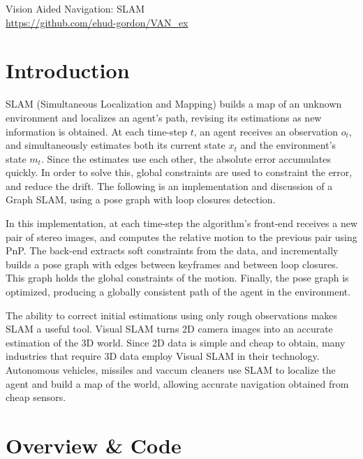 \documentclass[12pt]{article}
\begin{document}
\begin{center}
    {\huge Vision Aided Navigation: SLAM}
    \\[1\baselineskip]
    \url{https://github.com/ehud-gordon/VAN_ex}
\end{center}
\tableofcontents
\section{Introduction}
SLAM (Simultaneous Localization and Mapping) builds a map of an unknown environment and localizes an agent's path, revising its estimations as new information is obtained. At each time-step $t$, an agent receives an observation \(o_t\), and simultaneously estimates both its current state $x_t$ and the environment's state $m_t$. Since the estimates use each other, the absolute error accumulates quickly. In order to solve this, global constraints are used to constraint the error, and reduce the drift. The following is an implementation and discussion of a Graph SLAM, using a pose graph with loop closures detection. 

In this implementation, at each time-step the algorithm's front-end receives a new pair of stereo images, and computes the relative motion to the previous pair using PnP. The back-end extracts soft constraints from the data, and incrementally builds a pose graph with edges between keyframes and between loop closures. This graph holds the global constraints of the motion. Finally, the pose graph is optimized, producing a globally consistent path of the agent in the environment. 

The ability to correct initial estimations using only rough observations makes SLAM a useful tool. Visual SLAM turns 2D camera images into an accurate estimation of the 3D world. Since 2D data is simple and cheap to obtain, many industries that require 3D data employ Visual SLAM in their technology. Autonomous vehicles, missiles and vaccum cleaners use SLAM to localize the agent and build a map of the world, allowing accurate navigation obtained from cheap sensors.
\newpage
\section{Overview \& Code}
\end{document}
